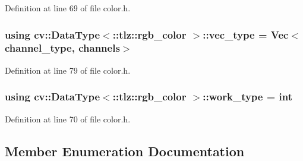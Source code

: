 Definition at line 69 of file color.\+h.

\subsubsection[{\texorpdfstring{vec\+\_\+type}{vec_type}}]{\setlength{\rightskip}{0pt plus 5cm}using cv\+::\+Data\+Type$<$\+::{\bf tlz\+::rgb\+\_\+color} $>$\+::{\bf vec\+\_\+type} =  Vec$<${\bf channel\+\_\+type}, {\bf channels}$>$}\hypertarget{classcv_1_1DataType_3_1_1tlz_1_1rgb__color_01_4_a51358996d23546beb56e1db3f5ad8e20}{}\label{classcv_1_1DataType_3_1_1tlz_1_1rgb__color_01_4_a51358996d23546beb56e1db3f5ad8e20}


Definition at line 79 of file color.\+h.

\subsubsection[{\texorpdfstring{work\+\_\+type}{work_type}}]{\setlength{\rightskip}{0pt plus 5cm}using cv\+::\+Data\+Type$<$\+::{\bf tlz\+::rgb\+\_\+color} $>$\+::{\bf work\+\_\+type} =  int}\hypertarget{classcv_1_1DataType_3_1_1tlz_1_1rgb__color_01_4_ac3b3faaa700443b53f8527edc1051b0c}{}\label{classcv_1_1DataType_3_1_1tlz_1_1rgb__color_01_4_ac3b3faaa700443b53f8527edc1051b0c}


Definition at line 70 of file color.\+h.



\subsection{Member Enumeration Documentation}
